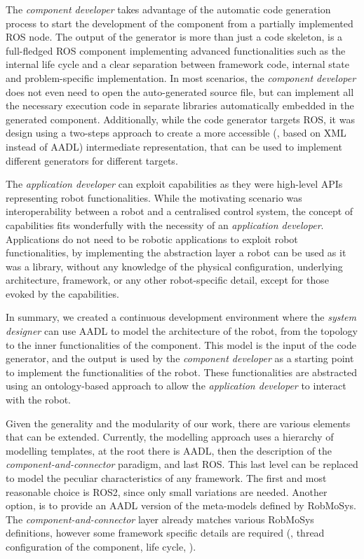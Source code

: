 The \textit{component developer} takes advantage of the automatic code generation process to start the development of the component from a partially implemented ROS node. The output of the generator is more than just a code skeleton, is a full-fledged ROS component implementing advanced functionalities such as the internal life cycle and a clear separation between framework code, internal state and problem-specific implementation. In most scenarios, the \textit{component developer} does not even need to open the auto-generated source file, but can implement all the necessary execution code in separate libraries automatically embedded in the generated component. Additionally, while the code generator targets ROS, it was design using a two-steps approach to create a more accessible (\ie, based on XML instead of AADL) intermediate representation, that can be used to implement different generators for different targets.

The \textit{application developer} can exploit capabilities as they were high-level APIs representing robot functionalities. While the motivating scenario was interoperability between a robot and a centralised control system, the concept of capabilities fits wonderfully with the necessity of an \textit{application developer}. Applications do not need to be robotic applications to exploit robot functionalities, by implementing the abstraction layer a robot can be used as it was a library, without any knowledge of the physical configuration, underlying architecture, framework, or any other robot-specific detail, except for those evoked by the capabilities. 

In summary, we created a continuous development environment where the \textit{system designer} can use AADL to model the architecture of the robot, from the topology to the inner functionalities of the component. This model is the input of the code generator, and the output is used by the \textit{component developer} as a starting point to implement the functionalities of the robot. These functionalities are abstracted using an ontology-based approach to allow the \textit{application developer} to interact with the robot.

Given the generality and the modularity of our work, there are various elements that can be extended. Currently, the modelling approach uses a hierarchy of modelling templates, at the root there is AADL, then the description of the \textit{component-and-connector} paradigm, and last ROS. This last level can be replaced to model the peculiar characteristics of any framework. The first and most reasonable choice is ROS2, since only small variations are needed. Another option, is to provide an AADL version of the meta-models defined by RobMoSys. The \textit{component-and-connector} layer already matches various RobMoSys definitions, however some framework specific details are required (\eg, thread configuration of the component, life cycle, \etc).

